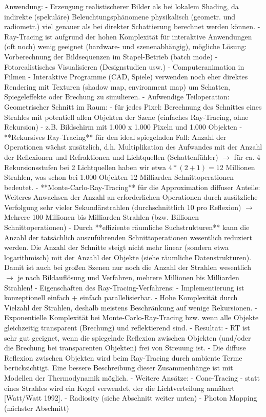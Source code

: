 \documentclass[10pt,landscape]{article}
\begin{document}
\begin{multicols}{3}
  Anwendung:
  - Erzeugung realistischerer Bilder als bei lokalem Shading, da indirekte (spekuläre) Beleuchtungsphänomene physikalisch (geometr. und radiometr.) viel genauer als bei direkter Schattierung berechnet werden können.
  - Ray-Tracing ist aufgrund der hohen Komplexität für interaktive Anwendungen (oft noch) wenig geeignet (hardware- und szenenabhängig), mögliche Lösung: Vorberechnung der Bildsequenzen im Stapel-Betrieb (batch mode)
  - Fotorealistisches Visualisieren (Designstudien usw.)
  - Computeranimation in Filmen
  - Interaktive Programme (CAD, Spiele) verwenden noch eher direktes Rendering mit Texturen (shadow map, environment map) um Schatten, Spiegeleffekte oder Brechung zu simulieren. 
  - Aufwendige Teiloperation: Geometrischer Schnitt im Raum:
  - für jedes Pixel: Berechnung des Schnittes eines Strahles mit potentiell allen Objekten der Szene (einfaches Ray-Tracing, ohne Rekursion)
  - z.B. Bildschirm mit 1.000 x 1.000 Pixeln und 1.000 Objekten
  - **Rekursives Ray-Tracing** für den ideal spiegelnden Fall: Anzahl der Operationen wächst zusätzlich, d.h. Multiplikation des Aufwandes mit der Anzahl der Reflexionen und Refraktionen und Lichtquellen (Schattenfühler) $\rightarrow$ für ca. 4 Rekursionsstufen bei 2 Lichtquellen haben wir etwa $4*(2 + 1) = 12$ Millionen Strahlen, was schon bei 1.000 Objekten 12 Milliarden Schnittoperationen bedeutet.
  - **Monte-Carlo-Ray-Tracing** für die Approximation diffuser Anteile: Weiteres Anwachsen der Anzahl an erforderlichen Operationen durch zusätzliche Verfolgung sehr vieler Sekundärstrahlen (durchschnittlich 10 pro Reflexion) $\rightarrow$ Mehrere 100 Millionen bis Milliarden Strahlen (bzw. Billionen Schnittoperationen)
  - Durch **effiziente räumliche Suchstrukturen** kann die Anzahl der tatsächlich auszuführenden Schnittoperationen wesentlich reduziert werden. Die Anzahl der Schnitte steigt nicht mehr linear (sondern etwa logarithmisch) mit der Anzahl der Objekte (siehe räumliche Datenstrukturen). Damit ist auch bei großen Szenen nur noch die Anzahl der Strahlen wesentlich $\rightarrow$ je nach Bildauflösung und Verfahren, mehrere Millionen bis Milliarden Strahlen!
  - Eigenschaften des Ray-Tracing-Verfahrens:
  - Implementierung ist konzeptionell einfach + einfach parallelisierbar.
  - Hohe Komplexität durch Vielzahl der Strahlen, deshalb meistens Beschränkung auf wenige Rekursionen.
  - Exponentielle Komplexität bei Monte-Carlo-Ray-Tracing bzw. wenn alle Objekte gleichzeitig transparent (Brechung) und reflektierend sind.
  - Resultat:
  - RT ist sehr gut geeignet, wenn die spiegelnde Reflexion zwischen Objekten (und/oder die Brechung bei transparenten Objekten) frei von Streuung ist.
  - Die diffuse Reflexion zwischen Objekten wird beim Ray-Tracing durch ambiente Terme berücksichtigt. Eine bessere Beschreibung dieser Zusammenhänge ist mit Modellen der Thermodynamik möglich.
  - Weitere Ansätze:
  - Cone-Tracing - statt eines Strahles wird ein Kegel verwendet, der die Lichtverteilung annähert [Watt/Watt 1992].
  - Radiosity (siehe Abschnitt weiter unten)
  - Photon Mapping (nächster Abschnitt)
  

\end{multicols}
\end{document}
